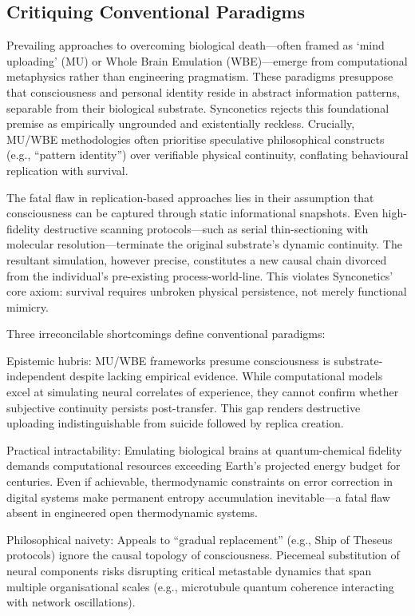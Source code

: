 \documentclass[10pt]{article}
\begin{document}
\begin{sloppypar}
  \subsection{Critiquing Conventional Paradigms}
  \label{sec:new-paradigm}

  Prevailing approaches to overcoming biological death—often framed as ‘mind uploading’ (MU) or Whole Brain Emulation (WBE)—emerge from computational metaphysics rather than engineering pragmatism. These paradigms presuppose that consciousness and personal identity reside in abstract information patterns, separable from their biological substrate. Synconetics rejects this foundational premise as empirically ungrounded and existentially reckless. Crucially, MU/WBE methodologies often prioritise speculative philosophical constructs (e.g., “pattern identity”) over verifiable physical continuity, conflating behavioural replication with survival.

  The fatal flaw in replication-based approaches lies in their assumption that consciousness can be captured through static informational snapshots. Even high-fidelity destructive scanning protocols—such as serial thin-sectioning with molecular resolution—terminate the original substrate’s dynamic continuity. The resultant simulation, however precise, constitutes a new causal chain divorced from the individual’s pre-existing process-world-line. This violates Synconetics’ core axiom: survival requires unbroken physical persistence, not merely functional mimicry.

  Three irreconcilable shortcomings define conventional paradigms:

  Epistemic hubris: MU/WBE frameworks presume consciousness is substrate-independent despite lacking empirical evidence. While computational models excel at simulating neural correlates of experience, they cannot confirm whether subjective continuity persists post-transfer. This gap renders destructive uploading indistinguishable from suicide followed by replica creation.

  Practical intractability: Emulating biological brains at quantum-chemical fidelity demands computational resources exceeding Earth’s projected energy budget for centuries. Even if achievable, thermodynamic constraints on error correction in digital systems make permanent entropy accumulation inevitable—a fatal flaw absent in engineered open thermodynamic systems.

  Philosophical naivety: Appeals to “gradual replacement” (e.g., Ship of Theseus protocols) ignore the causal topology of consciousness. Piecemeal substitution of neural components risks disrupting critical metastable dynamics that span multiple organisational scales (e.g., microtubule quantum coherence interacting with network oscillations).


\end{sloppypar}
\end{document}
